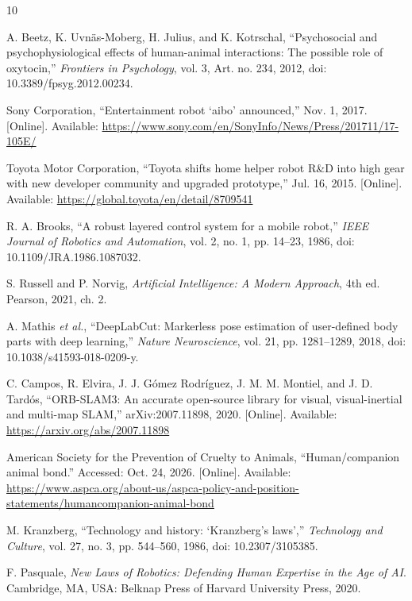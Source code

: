 \documentclass[conference,letterpaper]{IEEEtran}
\begin{document}
\begin{thebibliography}{10}

 A. Beetz, K. Uvnäs-Moberg, H. Julius, and K. Kotrschal, ``Psychosocial and psychophysiological effects of human-animal interactions: The possible role of oxytocin,'' \emph{Frontiers in Psychology}, vol. 3, Art. no. 234, 2012, doi: 10.3389/fpsyg.2012.00234.

 Sony Corporation, ``Entertainment robot `aibo' announced,'' Nov. 1, 2017. [Online]. Available: \url{https://www.sony.com/en/SonyInfo/News/Press/201711/17-105E/}

 Toyota Motor Corporation, ``Toyota shifts home helper robot R\&D into high gear with new developer community and upgraded prototype,'' Jul. 16, 2015. [Online]. Available: \url{https://global.toyota/en/detail/8709541}

 R. A. Brooks, ``A robust layered control system for a mobile robot,'' \emph{IEEE Journal of Robotics and Automation}, vol. 2, no. 1, pp. 14--23, 1986, doi: 10.1109/JRA.1986.1087032.

 S. Russell and P. Norvig, \emph{Artificial Intelligence: A Modern Approach}, 4th ed. Pearson, 2021, ch. 2.

 A. Mathis \emph{et al.}, ``DeepLabCut: Markerless pose estimation of user-defined body parts with deep learning,'' \emph{Nature Neuroscience}, vol. 21, pp. 1281--1289, 2018, doi: 10.1038/s41593-018-0209-y.

 C. Campos, R. Elvira, J. J. Gómez Rodríguez, J. M. M. Montiel, and J. D. Tardós, ``ORB-SLAM3: An accurate open-source library for visual, visual-inertial and multi-map SLAM,'' arXiv:2007.11898, 2020. [Online]. Available: \url{https://arxiv.org/abs/2007.11898}

 American Society for the Prevention of Cruelty to Animals, ``Human/companion animal bond.'' Accessed: Oct. 24, 2026. [Online]. Available: \url{https://www.aspca.org/about-us/aspca-policy-and-position-statements/humancompanion-animal-bond}

 M. Kranzberg, ``Technology and history: `Kranzberg's laws','' \emph{Technology and Culture}, vol. 27, no. 3, pp. 544--560, 1986, doi: 10.2307/3105385.

 F. Pasquale, \emph{New Laws of Robotics: Defending Human Expertise in the Age of AI}. Cambridge, MA, USA: Belknap Press of Harvard University Press, 2020.
\end{thebibliography}
\end{document}
